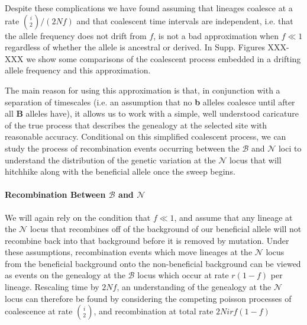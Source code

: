 \documentclass[a4paper,10pt]{article}
\newcommand{\fancyN}{$\mathcal N$ }
\newcommand{\fancyB}{$\mathcal B$ }
\begin{document}
Despite these complications we have found assuming that lineages coalesce at a rate $ {i \choose 2}/(2 N f)$ and that coalescent time intervals are independent, i.e. that the allele frequency does not drift from $f$, is not a bad approximation when $f \ll 1$ regardless of whether the allele is ancestral or derived. In Supp. Figures XXX-XXX we show some comparisons of the coalescent process embedded in a drifting allele frequency and this approximation. 

The main reason for using this approximation is that, in conjunction with a separation of timescales (i.e. an assumption that no \textbf{b} alleles coalesce until after all \textbf{B} alleles have), it allows us to work with a simple, well understood caricature of the true process that describes the genealogy at the selected site with reasonable accuracy. Conditional on this simplified coalescent process, we can study the process of recombination events occurring between the \fancyB and \fancyN loci to understand the distribution of the genetic variation at the \fancyN locus that will hitchhike along with the beneficial allele once the sweep begins. 

\paragraph{Recombination Between \fancyB and \fancyN}
We will again rely on the condition that $f \ll 1$, and assume that any lineage at the \fancyN locus that recombines off of the background of our beneficial allele will not recombine back into that background before it is removed by mutation. Under these assumptions, recombination events which move lineages at the \fancyN locus from the beneficial background onto the non-beneficial background can be viewed as events on the genealogy at the \fancyB locus which occur at rate $r\left(1-f\right)$ per lineage. Rescaling time by $2Nf$, an understanding of the genealogy at the \fancyN locus can therefore be found by considering the competing poisson processes of coalescence at rate ${i \choose 2}$, and recombination at total rate $2Nirf(1-f)$

\end{document}
